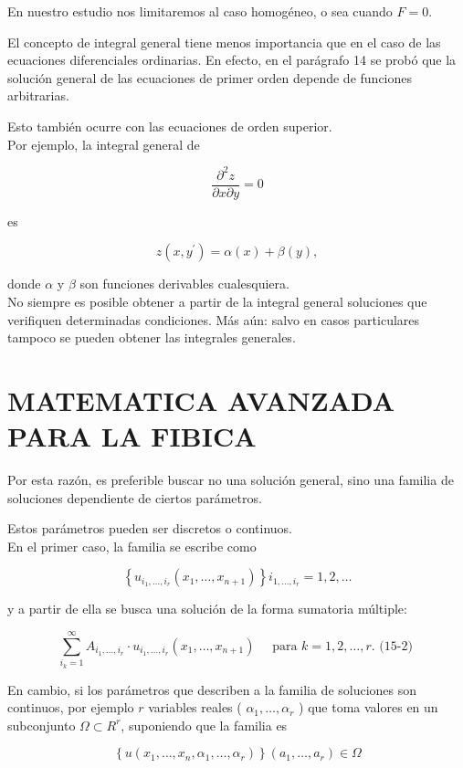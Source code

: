 \documentclass[10pt]{article}
\theoremstyle{plain}
\theoremstyle{definition}
\theoremstyle{remark}
\begin{document}
En nuestro estudio nos limitaremos al caso homogéneo, o sea cuando $F=0$.

El concepto de integral general tiene menos importancia que en el caso de las ecuaciones diferenciales ordinarias. En efecto, en el parágrafo 14 se probó que la solución general de las ecuaciones de primer orden depende de funciones arbitrarias.

Esto también ocurre con las ecuaciones de orden superior.\\
Por ejemplo, la integral general de

$$
\frac{\partial^{2} z}{\partial x \partial y}=0
$$

es

$$
z\left(x, y^{\prime}\right)=\alpha(x)+\beta(y),
$$

donde $\alpha$ y $\beta$ son funciones derivables cualesquiera.\\
No siempre es posible obtener a partir de la integral general soluciones que verifiquen determinadas condiciones. Más aún: salvo en casos particulares tampoco se pueden obtener las integrales generales.

\section*{MATEMATICA AVANZADA PARA LA FIBICA}
Por esta razón, es preferible buscar no una solución general, sino una familia de soluciones dependiente de ciertos parámetros.

Estos parámetros pueden ser discretos o continuos.\\
En el primer caso, la familia se escribe como

$$
\left\{u_{i_{1}, \ldots, i_{r}}\left(x_{1}, \ldots, x_{n+1}\right)\right\} i_{1, \ldots, i_{r}}=1,2, \ldots
$$

y a partir de ella se busca una solución de la forma sumatoria múltiple:

$$
\sum_{i_{k}=1}^{\infty} A_{i_{1}, \ldots, i_{r}} \cdot u_{i_{1}, \ldots, i_{r}}\left(x_{1}, \ldots, x_{n+1}\right) \quad \text { para } k=1,2, \ldots, r . \text { (15-2) }
$$

En cambio, si los parámetros que describen a la familia de soluciones son continuos, por ejemplo $r$ variables reales ( $\alpha_{1}, \ldots, \alpha_{r}$ ) que toma valores en un subconjunto $\Omega \subset R^{r}$, suponiendo que la familia es

$$
\left\{u\left(x_{1}, \ldots, x_{n}, \alpha_{1}, \ldots, \alpha_{r}\right)\right\}\left(a_{1}, \ldots, a_{r}\right) \in \Omega
$$
\end{document}

